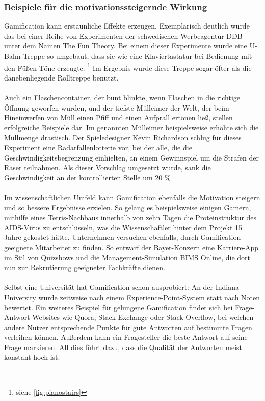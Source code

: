 \subsubsection{Beispiele für die motivationssteigernde Wirkung}
Gamification kann erstaunliche Effekte erzeugen. Exemplarisch deutlich wurde das bei einer Reihe von Experimenten der schwedischen Werbeagentur DDB unter dem Namen \glqq The Fun Theory\grqq . Bei einem dieser Experimente wurde eine U-Bahn-Treppe so umgebaut, dass sie wie eine Klaviertastatur bei Bedienung mit den Füßen Töne erzeugte. \footnote[4]{siehe \autoref{fig:pianostairs}} Im Ergebnis wurde diese Treppe sogar öfter als die danebenliegende Rolltreppe benutzt. \cite{Src:PlanetWissen} \\ \\
Auch ein Flaschencontainer, der bunt blinkte, wenn Flaschen in die richtige Öffnung geworfen wurden, und der \glqq tiefste Mülleimer der Welt\grqq , der beim Hineinwerfen von Müll einen Pfiff und einen Aufprall ertönen ließ, stellen erfolgreiche Beispiele dar. Im genannten Mülleimer beispielsweise erhöhte sich die Müllmenge drastisch. \cite{Src:PlanetWissen} Der Spieledesigner Kevin Richardson schlug für dieses Experiment eine Radarfallenlotterie vor, bei der alle, die die Geschwindigkeitsbegrenzung einhielten, an einem Gewinnspiel um die Strafen der Raser teilnahmen. Als dieser Vorschlag umgesetzt wurde, sank die Geschwindigkeit an der kontrollierten Stelle um 20 \% \cite{Src:GamifDesign} \\ \\
Im wissenschaftlichen Umfeld kann Gamification ebenfalls die Motivation steigern und so bessere Ergebnisse erzielen. So gelang es beispielsweise einigen Gamern, mithilfe eines Tetris-Nachbaus innerhalb von zehn Tagen die Proteinstruktur des AIDS-Virus zu entschlüsseln, was die Wissenschaftler hinter dem Projekt 15 Jahre gekostet hätte. \cite{Src:DLFMotiv} Unternehmen versuchen ebenfalls, durch Gamification geeignete Mitarbeiter zu finden. So entwarf der Bayer-Konzern eine Karriere-App im Stil von Quizshows und die Management-Simulation \glqq BIMS Online\grqq , die dort nun zur Rekrutierung geeigneter Fachkräfte dienen. \\ \\
Selbst eine Universität hat Gamification schon ausprobiert: An der Indiana University wurde zeitweise nach einem Experience-Point-System statt nach Noten bewertet. \cite{Src:XPNoten} Ein weiteres Beispiel für gelungene Gamification findet sich bei Frage-Antwort-Websites wie Quora, Stack Exchange oder Stack Overflow, bei welchen andere Nutzer entsprechende Punkte für gute Antworten auf bestimmte Fragen verleihen können. Außerdem kann ein Fragesteller die beste Antwort auf seine Frage markieren. All dies führt dazu, dass die Qualität der Antworten meist konstant hoch ist. \cite{Src:GamifDesign} \\ \\
